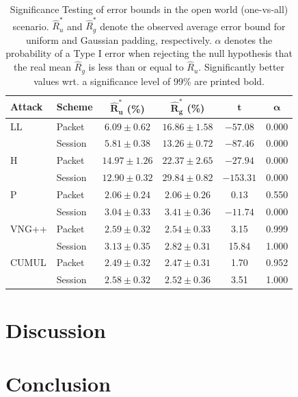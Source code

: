 \documentclass[
	ruledheaders=chapter,
	class=report,
	thesis={type=master, department=inf},
	accentcolor=1c,
	custommargins=true,
	marginpar=false,
	parskip=half-,
	fontsize=11pt,
]{tudapub}
\begin{document}
	\begin{table}
		\centering
		\small
		\begin{tabular}{llcccc}
			\toprule \textbf{Attack} & \textbf{Scheme} & $\mathbf{\widehat{R}^*_u}$ \textbf{(\%)} & $\mathbf{\widehat{R}^*_g}$  \textbf{(\%)} & $\mathbf{t}$ & $\mathbf{\alpha}$ \\
			\midrule LL & Packet & $6.09 \pm 0.62$ & $\mathbf{16.86 \pm 1.58}$ & $-57.08$ & 0.000\\
			& Session & $5.81 \pm 0.38$ & $\mathbf{13.26 \pm 0.72}$ & $-87.46$ &  0.000\\ \addlinespace
			H & Packet & $14.97 \pm 1.26$ & $\mathbf{22.37 \pm 2.65}$ & $-27.94$ & 0.000 \\
			& Session & $12.90 \pm 0.32$ & $\mathbf{29.84 \pm 0.82}$ & $-153.31$ & 0.000 \\ \addlinespace
			P & Packet & $2.06 \pm 0.24$ & $2.06 \pm 0.26$ & $0.13$ & 0.550 \\
			& Session & $3.04 \pm 0.33$ & $\mathbf{3.41 \pm 0.36}$ & $-11.74$ & 0.000 \\ \addlinespace
			VNG++ & Packet & $\mathbf{2.59 \pm 0.32}$ & $2.54 \pm 0.33$ & 3.15 & 0.999 \\
			& Session & $\mathbf{3.13 \pm 0.35}$ & $2.82 \pm 0.31$ & 15.84 & 1.000 \\ \addlinespace
			CUMUL & Packet & $2.49\pm 0.32$ & $2.47 \pm 0.31$ & 1.70 & 0.952\\
			& Session & $\mathbf{2.58 \pm 0.32}$ & $2.52 \pm 0.36$ & 3.51 & 1.000 \\
			\bottomrule
		\end{tabular}
		\caption[Significance Testing of error bounds in the open world scenario]{Significance Testing of error bounds in the open world (one-vs-all) scenario. $\widehat{R}^*_u$ and $\widehat{R}^*_g$ denote the observed average error bound for uniform and Gaussian padding, respectively. $\alpha$ denotes the probability of a Type I error when rejecting the null hypothesis that the real mean $\widehat{R}_g$ is less than or equal to $\widehat{R}_u$. Significantly better values wrt. a significance level of 99\% are printed bold. }
		\label{tbl:sig_bound_ow}
	\end{table}

	\chapter{Discussion}
	\label{discussion}

	\chapter{Conclusion}
	\label{conclusion}

	\pagebreak
	\setcounter{page}{5}
	\printbibliography

	\cleardoublepage
	\listoffigures

	\cleardoublepage
	\listoftables
\end{document}
